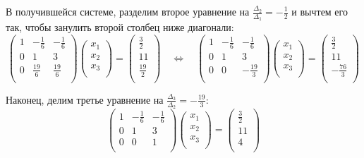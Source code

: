 \documentclass{article}
\begin{document}
\begin{example}
	В получившейся системе, разделим второе уравнение на
	$\frac{\Delta_2}{\Delta_1}=-\frac{1}{2}$ и вычтем его так, чтобы
	занулить второй столбец ниже диагонали:
	\[
		\begin{pmatrix}
			1	&-\frac{1}{6}	& -\frac{1}{6}	\\
			0	& 1	& 3	\\
			0	& \frac{19}{6}	& \frac{19}{6}	\\
		\end{pmatrix}
		\begin{pmatrix}
			x_1 \\
			x_2 \\
			x_3 \\
		\end{pmatrix}
		=
		\begin{pmatrix}
			\frac{3}{2} \\
			11 \\
			\frac{19}{2} \\
		\end{pmatrix}
		\quad\Leftrightarrow\quad
		\begin{pmatrix}
			1	&-\frac{1}{6}	& -\frac{1}{6}	\\
			0	& 1	& 3	\\
			0	& 0	& -\frac{19}{3}	\\
		\end{pmatrix}
		\begin{pmatrix}
			x_1 \\
			x_2 \\
			x_3 \\
		\end{pmatrix}
		=
		\begin{pmatrix}
			\frac{3}{2} \\
			11 \\
			-\frac{76}{3} \\
		\end{pmatrix}
	\]

	Наконец, делим третье уравнение на $\frac{\Delta_3}{\Delta_2}=
	-\frac{19}{3}$:
	\[
		\begin{pmatrix}
			1	&-\frac{1}{6}	& -\frac{1}{6}	\\
			0	& 1	& 3	\\
			0	& 0	& 1	\\
		\end{pmatrix}
		\begin{pmatrix}
			x_1 \\
			x_2 \\
			x_3 \\
		\end{pmatrix}
		=
		\begin{pmatrix}
			\frac{3}{2} \\
			11 \\
			4 \\
		\end{pmatrix}
	\]


\end{example}
\end{document}
